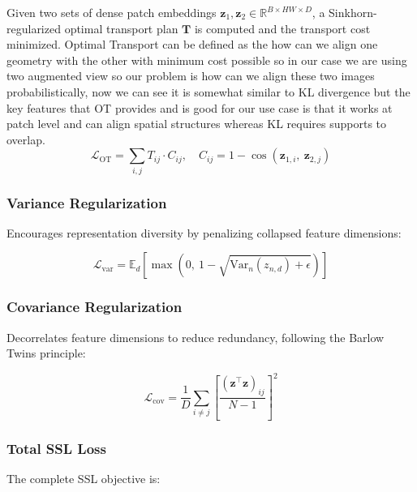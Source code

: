 Given two sets of dense patch embeddings $\mathbf{z}_1, \mathbf{z}_2 \in \mathbb{R}^{B \times HW \times D}$, a Sinkhorn-regularized optimal transport plan $\mathbf{T}$ is computed and the transport cost minimized.
\newline
Optimal Transport can be defined as the how can we align one geometry with the other with minimum cost possible so in our case we are using two augmented view so our problem is how can we align these two images probabilistically, now we can see it is somewhat similar to KL divergence but the key features that OT provides and is good for our use case is that it works at patch level and can align spatial structures whereas KL requires supports to overlap.
\begin{equation}
\mathcal{L}_{\text{OT}} = \sum_{i,j} T_{ij} \cdot C_{ij}, \quad C_{ij} = 1 - \cos\left(\mathbf{z}_{1,i},\ \mathbf{z}_{2,j}\right)
\end{equation}


\subsubsection{Variance Regularization~\cite{otcxr}}

Encourages representation diversity by penalizing collapsed feature dimensions:

\begin{equation}
\mathcal{L}_{\text{var}} = \mathbb{E}_d \left[\max\!\left(0,\ 1 - \sqrt{\mathrm{Var}_n(z_{n,d}) + \epsilon}\right)\right]
\end{equation}


\subsubsection{Covariance Regularization~\cite{otcxr}}

Decorrelates feature dimensions to reduce redundancy, following the Barlow Twins principle:

\begin{equation}
\mathcal{L}_{\text{cov}} = \frac{1}{D} \sum_{i \neq j} \left[\frac{(\mathbf{z}^\top \mathbf{z})_{ij}}{N-1}\right]^2
\end{equation}



\subsubsection{Total SSL Loss}

The complete SSL objective is:

